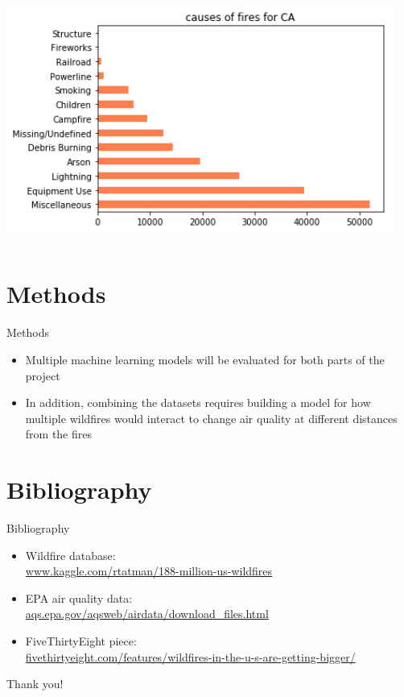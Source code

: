 \documentclass{beamer}
\begin{document}
\begin{frame}[plain]
\begin{columns}[T]
\begin{column}{0.5\textwidth}
\noindent
\includegraphics[width=0.95\textwidth]{fire_causes.png}
\end{column}
\end{columns}
\end{frame}

\section{Methods}

\begin{frame}{Methods}
\begin{itemize}
\item Multiple machine learning models will be evaluated for both parts of the project
\item In addition, combining the datasets requires building a model for how multiple wildfires would interact to change air quality at different distances from the fires
\end{itemize}
\end{frame}

\section{Bibliography}

\begin{frame}{Bibliography}
\begin{itemize}
\item Wildfire database: \\ \url{www.kaggle.com/rtatman/188-million-us-wildfires}
\item EPA air quality data: \\ \url{aqs.epa.gov/aqsweb/airdata/download_files.html}
\item FiveThirtyEight piece: \\ \url{fivethirtyeight.com/features/wildfires-in-the-u-s-are-getting-bigger/}
\end{itemize}
\end{frame}

\begin{frame}[plain]
\begin{center}
\LARGE Thank you!
\end{center}
\end{frame}
\end{document}
